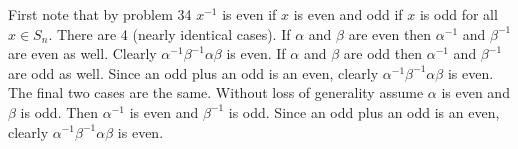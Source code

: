 \documentclass[a4paper]{article}
\begin{document}
\vspace{\baselineskip}

First note that by problem 34 $x^{-1}$ is even if $x$ is even and odd if $x$ is odd for all $x \in S_n$. There are 4 (nearly identical cases). If $\alpha$ and $\beta$ are even then $\alpha^{-1}$ and $\beta^{-1}$ are even as well. Clearly $\alpha^{-1} \beta^{-1} \alpha \beta$ is even. If $\alpha$ and $\beta$ are odd then $\alpha^{-1}$ and $\beta^{-1}$ are odd as well. Since an odd plus an odd is an even, clearly $\alpha^{-1} \beta^{-1} \alpha \beta$ is even. The final two cases are the same. Without loss of generality assume $\alpha$ is even and $\beta$ is odd. Then $\alpha^{-1}$ is even and $\beta^{-1}$ is odd. Since an odd plus an odd is an even, clearly $\alpha^{-1} \beta^{-1} \alpha \beta$ is even.
\end{document}
